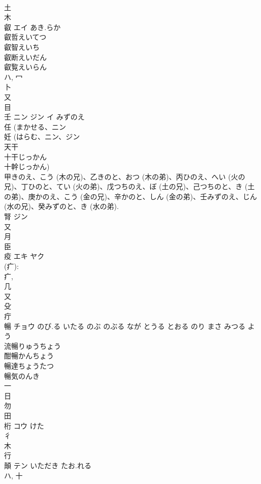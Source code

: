 \documentclass[8pt]{extreport}
\begin{document}
\begin{CJK}{UTF8}{min}
\\	土 
\\	木 
\\	叡	エイ	あき.らか	
\\	叡哲えいてつ
\\	叡智えいち
\\	叡断えいだん
\\	叡覧えいらん
\\	ハ, 冖 
\\	卜 
\\	又 
\\	目 
\\	壬	ニン ジン イ	みずのえ	
\\	任 (まかせる、ニン 
\\	妊 (はらむ、ニン、ジン 
\\	天干 
\\	十干じっかん 
\\	十幹じっかん) 
\\	甲きのえ、こう (木の兄)、乙きのと、おつ (木の弟)、丙ひのえ、へい (火の兄)、丁ひのと、てい (火の弟)、戊つちのえ、ぼ (土の兄)、己つちのと、き (土の弟)、庚かのえ、こう (金の兄)、辛かのと、しん (金の弟)、壬みずのえ、じん (水の兄)、癸みずのと、き (水の弟). 
\\	腎	ジン		
\\	又 
\\	月 
\\	臣 
\\	疫	エキ ヤク		
\\	(疒): 
\\	疒, 
\\	几 
\\	又 
\\	殳 
\\	疔 
\\	暢	チョウ	のび.る いたる のぶ のぶる なが とうる とおる のり まさ みつる よう	
\\	流暢りゅうちょう 
\\	酣暢かんちょう 
\\	暢達ちょうたつ 
\\	暢気のんき 
\\	一 
\\	日 
\\	勿 
\\	田 
\\	桁	コウ	けた	
\\	彳 
\\	木 
\\	行 
\\	顛	テン	いただき たお.れる	
\\	ハ, 十 

\end{CJK}
\end{document}
